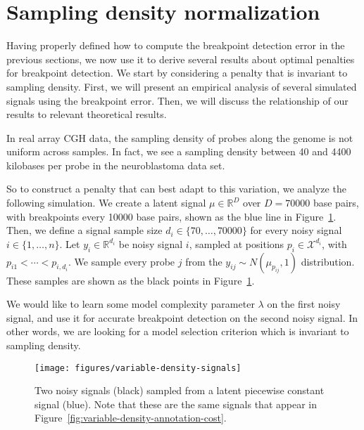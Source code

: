 \documentclass{jsfds} %
\newcommand{\RR}{\mathbb{R}}
\begin{document}
\newpage

\section{Sampling density normalization}
\label{variable_density}
Having properly defined how to compute the breakpoint detection error
in the previous sections, we now use it to derive several results
about optimal penalties for breakpoint detection. We start by
considering a penalty that is invariant to sampling density. First, we
will present an empirical analysis of several simulated signals using
the breakpoint error. Then, we will discuss the relationship of our
results to relevant theoretical results.

In real array CGH data, the sampling density of probes along the
genome is not uniform across samples. In fact, we see a sampling
density between 40 and 4400 kilobases per probe in the neuroblastoma
data set.

So to construct a penalty that can best adapt to this variation, we
analyze the following simulation. We create a latent signal
$\mu\in\RR^D$ over $D=70000$ base pairs, with breakpoints every 10000
base pairs, shown as the blue line in
Figure~\ref{fig:variable-density-signals}. Then, we define a signal
sample size $d_i\in\{70,\dots,70000\}$ for every noisy signal
$i\in\{1,\dots,n\}$. Let $y_i\in\RR^{d_i}$ be noisy signal $i$,
sampled at positions $p_i\in\mathcal X^{d_i}$, with
$p_{i1}<\cdots<p_{i,d_i}$. We sample every probe $j$ from the
$y_{ij}\sim N(\mu_{p_{ij}},1)$ distribution. These samples are shown
as the black points in Figure~\ref{fig:variable-density-signals}.

We would like to learn some model complexity parameter $\lambda$ on
the first noisy signal, and use it for accurate breakpoint detection
on the second noisy signal. In other words, we are looking for a model
selection criterion which is invariant to sampling density. 

\begin{figure}[H]
\texttt{[image: figures/variable-density-signals]}
%
\vskip -0.3cm
  \caption{Two noisy signals (black) sampled from
  a latent piecewise constant signal (blue). Note that these are the
  same signals that appear in
  Figure~\ref{fig:variable-density-annotation-cost}.}
\label{fig:variable-density-signals}
\end{figure}

\newpage
\end{document}
